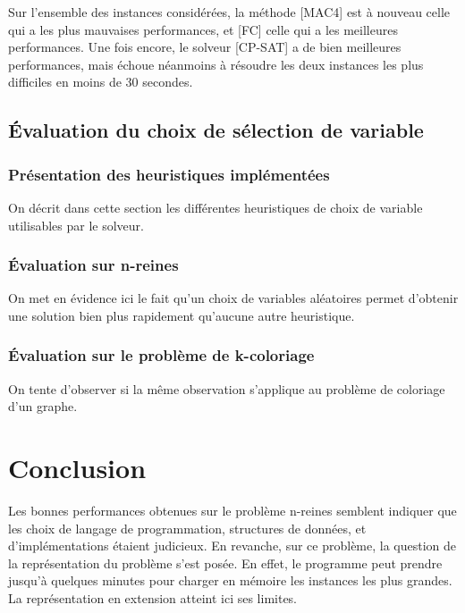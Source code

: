 \documentclass[14pt]{article}
\begin{document}
Sur l'ensemble des instances considérées, la méthode [MAC4] est à nouveau celle qui a les plus mauvaises performances, et [FC] celle qui a les meilleures performances. Une fois encore, le solveur [CP-SAT] a de bien meilleures performances, mais échoue néanmoins à résoudre les deux instances les plus difficiles en moins de 30 secondes.

\subsection{Évaluation du choix de sélection de variable}

\subsubsection{Présentation des heuristiques implémentées}

On décrit dans cette section les différentes heuristiques de choix de variable utilisables par le solveur.

\subsubsection{Évaluation sur n-reines}

On met en évidence ici le fait qu'un choix de variables aléatoires permet d'obtenir une solution bien plus rapidement qu'aucune autre heuristique.

\subsubsection{Évaluation sur le problème de k-coloriage}

On tente d'observer si la même observation s'applique au problème de coloriage d'un graphe.


\clearpage

\section{Conclusion}

Les bonnes performances obtenues sur le problème n-reines semblent indiquer que les choix de langage de programmation, structures de données, et d'implémentations étaient judicieux. En revanche, sur ce problème, la question de la représentation du problème s'est posée. En effet, le programme peut prendre jusqu'à quelques minutes pour charger en mémoire les instances les plus grandes. La représentation en extension atteint ici ses limites.\\
\end{document}
